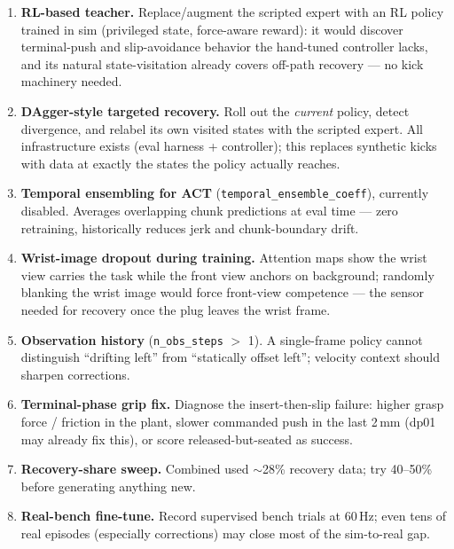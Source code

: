 \begin{enumerate}
    \item \textbf{RL-based teacher.} Replace/augment the scripted expert with an RL
    policy trained in sim (privileged state, force-aware reward): it would discover
    terminal-push and slip-avoidance behavior the hand-tuned controller lacks, and
    its natural state-visitation already covers off-path recovery --- no kick
    machinery needed.
    \item \textbf{DAgger-style targeted recovery.} Roll out the \emph{current} policy,
    detect divergence, and relabel its own visited states with the scripted expert.
    All infrastructure exists (eval harness + controller); this replaces synthetic
    kicks with data at exactly the states the policy actually reaches.
    \item \textbf{Temporal ensembling for ACT} (\texttt{temporal\_ensemble\_coeff}),
    currently disabled. Averages overlapping chunk predictions at eval time --- zero
    retraining, historically reduces jerk and chunk-boundary drift.
    \item \textbf{Wrist-image dropout during training.} Attention maps show the wrist
    view carries the task while the front view anchors on background; randomly
    blanking the wrist image would force front-view competence --- the sensor needed
    for recovery once the plug leaves the wrist frame.
    \item \textbf{Observation history} (\texttt{n\_obs\_steps} $>$ 1). A single-frame
    policy cannot distinguish ``drifting left'' from ``statically offset left'';
    velocity context should sharpen corrections.
    \item \textbf{Terminal-phase grip fix.} Diagnose the insert-then-slip failure:
    higher grasp force / friction in the plant, slower commanded push in the last
    2\,mm (dp01 may already fix this), or score released-but-seated as success.
    \item \textbf{Recovery-share sweep.} Combined used $\sim$28\% recovery data;
    try 40--50\% before generating anything new.
    \item \textbf{Real-bench fine-tune.} Record supervised bench trials at 60\,Hz;
    even tens of real episodes (especially corrections) may close most of the
    sim-to-real gap.
\end{enumerate}


